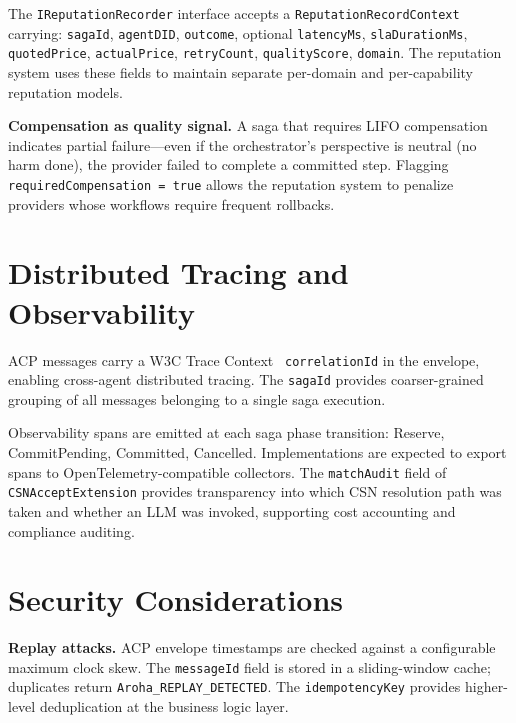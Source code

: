 \documentclass[conference]{IEEEtran}
\begin{document}
The \texttt{IReputationRecorder} interface accepts a
\texttt{ReputationRecordContext} carrying: \texttt{sagaId},
\texttt{agentDID}, \texttt{outcome}, optional
\texttt{latencyMs}, \texttt{slaDurationMs}, \texttt{quotedPrice},
\texttt{actualPrice}, \texttt{retryCount}, \texttt{qualityScore},
\texttt{domain}.  The reputation system uses these fields to maintain
separate per-domain and per-capability reputation models.

\textbf{Compensation as quality signal.}  A saga that requires
LIFO compensation indicates partial failure—even if the orchestrator's
perspective is neutral (no harm done), the provider failed to complete
a committed step.  Flagging \texttt{requiredCompensation = true}
allows the reputation system to penalize providers whose workflows
require frequent rollbacks.

\section{Distributed Tracing and Observability}
\label{sec:tracing}

ACP messages carry a W3C Trace Context~\cite{w3c2021tracecontext}
\texttt{correlationId} in the envelope, enabling cross-agent
distributed tracing.  The \texttt{sagaId} provides coarser-grained
grouping of all messages belonging to a single saga execution.

Observability spans are emitted at each saga phase transition:
Reserve, CommitPending, Committed, Cancelled.  Implementations
are expected to export spans to OpenTelemetry-compatible collectors.
The \texttt{matchAudit} field of \texttt{CSNAcceptExtension} provides
transparency into which CSN resolution path was taken and whether an
LLM was invoked, supporting cost accounting and compliance auditing.

\section{Security Considerations}
\label{sec:security}

\textbf{Replay attacks.}  ACP envelope timestamps are checked against
a configurable maximum clock skew.  The \texttt{messageId} field
is stored in a sliding-window cache; duplicates return
\texttt{Aroha\_REPLAY\_DETECTED}.  The \texttt{idempotencyKey}
provides higher-level deduplication at the business logic layer.
\end{document}
